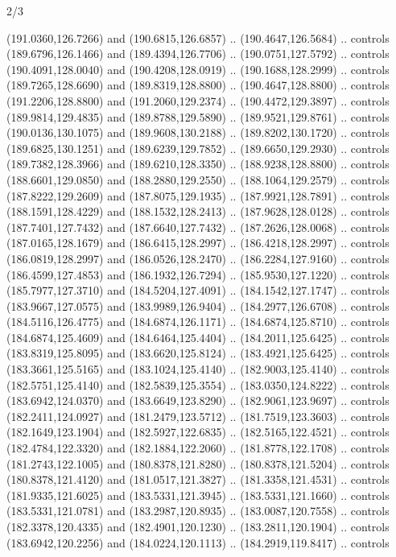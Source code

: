 \begin{flagdescription}{2/3}
\begin{scope}[xshift=0.5\flaglength,yshift=0.5\flagwidth,scale=\flagwidth/180]
\begin{scope}[y=0.8pt, x=0.8pt, yscale=-1,shift={(-168.75,-108.75)}]
  (191.0360,126.7266) and (190.6815,126.6857) .. (190.4647,126.5684) .. controls
  (189.6796,126.1466) and (189.4394,126.7706) .. (190.0751,127.5792) .. controls
  (190.4091,128.0040) and (190.4208,128.0919) .. (190.1688,128.2999) .. controls
  (189.7265,128.6690) and (189.8319,128.8800) .. (190.4647,128.8800) .. controls
  (191.2206,128.8800) and (191.2060,129.2374) .. (190.4472,129.3897) .. controls
  (189.9814,129.4835) and (189.8788,129.5890) .. (189.9521,129.8761) .. controls
  (190.0136,130.1075) and (189.9608,130.2188) .. (189.8202,130.1720) .. controls
  (189.6825,130.1251) and (189.6239,129.7852) .. (189.6650,129.2930) .. controls
  (189.7382,128.3966) and (189.6210,128.3350) .. (188.9238,128.8800) .. controls
  (188.6601,129.0850) and (188.2880,129.2550) .. (188.1064,129.2579) .. controls
  (187.8222,129.2609) and (187.8075,129.1935) .. (187.9921,128.7891) .. controls
  (188.1591,128.4229) and (188.1532,128.2413) .. (187.9628,128.0128) .. controls
  (187.7401,127.7432) and (187.6640,127.7432) .. (187.2626,128.0068) .. controls
  (187.0165,128.1679) and (186.6415,128.2997) .. (186.4218,128.2997) .. controls
  (186.0819,128.2997) and (186.0526,128.2470) .. (186.2284,127.9160) .. controls
  (186.4599,127.4853) and (186.1932,126.7294) .. (185.9530,127.1220) .. controls
  (185.7977,127.3710) and (184.5204,127.4091) .. (184.1542,127.1747) .. controls
  (183.9667,127.0575) and (183.9989,126.9404) .. (184.2977,126.6708) .. controls
  (184.5116,126.4775) and (184.6874,126.1171) .. (184.6874,125.8710) .. controls
  (184.6874,125.4609) and (184.6464,125.4404) .. (184.2011,125.6425) .. controls
  (183.8319,125.8095) and (183.6620,125.8124) .. (183.4921,125.6425) .. controls
  (183.3661,125.5165) and (183.1024,125.4140) .. (182.9003,125.4140) .. controls
  (182.5751,125.4140) and (182.5839,125.3554) .. (183.0350,124.8222) .. controls
  (183.6942,124.0370) and (183.6649,123.8290) .. (182.9061,123.9697) .. controls
  (182.2411,124.0927) and (181.2479,123.5712) .. (181.7519,123.3603) .. controls
  (182.1649,123.1904) and (182.5927,122.6835) .. (182.5165,122.4521) .. controls
  (182.4784,122.3320) and (182.1884,122.2060) .. (181.8778,122.1708) .. controls
  (181.2743,122.1005) and (180.8378,121.8280) .. (180.8378,121.5204) .. controls
  (180.8378,121.4120) and (181.0517,121.3827) .. (181.3358,121.4531) .. controls
  (181.9335,121.6025) and (183.5331,121.3945) .. (183.5331,121.1660) .. controls
  (183.5331,121.0781) and (183.2987,120.8935) .. (183.0087,120.7558) .. controls
  (182.3378,120.4335) and (182.4901,120.1230) .. (183.2811,120.1904) .. controls
  (183.6942,120.2256) and (184.0224,120.1113) .. (184.2919,119.8417) .. controls

\end{scope}
\end{scope}
\end{flagdescription}
